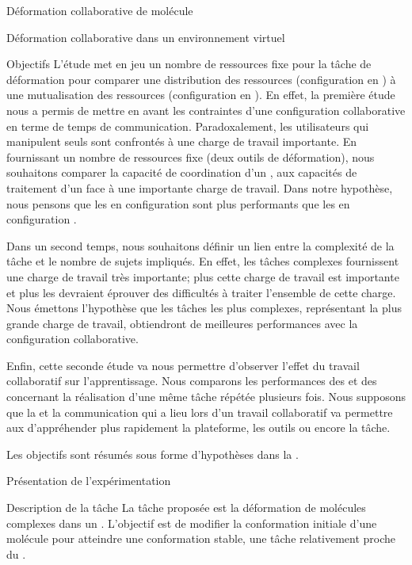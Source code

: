 \documentclass[myfrancais,ngerman,english,french]{mythesis}
\begin{document}
\begin{mychapter}{Déformation collaborative de molécule}
\begin{mysection}{Déformation collaborative dans un environnement virtuel}
\begin{mysubsection}{Objectifs}
				L'étude met en jeu un nombre de ressources fixe pour la tâche de déformation pour comparer une distribution des ressources (configuration  en ) à une mutualisation des ressources (configuration  en ).
				En effet, la première étude nous a permis de mettre en avant les contraintes d'une configuration collaborative en terme de temps de communication.
				Paradoxalement, les utilisateurs qui manipulent seuls sont confrontés à une charge de travail importante.
				En fournissant un nombre de ressources fixe (deux outils de déformation), nous souhaitons comparer la capacité de coordination d'un , aux capacités de traitement d'un  face à une importante charge de travail.
				Dans notre hypothèse, nous pensons que les  en configuration  sont plus performants que les  en configuration .

				Dans un second temps, nous souhaitons définir un lien entre la complexité de la tâche et le nombre de sujets impliqués.
				En effet, les tâches complexes fournissent une charge de travail très importante; plus cette charge de travail est importante et plus les  devraient éprouver des difficultés à traiter l'ensemble de cette charge.
				Nous émettons l'hypothèse que les tâches les plus complexes, représentant la plus grande charge de travail, obtiendront de meilleures performances avec la configuration collaborative.

				Enfin, cette seconde étude va nous permettre d'observer l'effet du travail collaboratif sur l'apprentissage.
				Nous comparons les performances des  et des  concernant la réalisation d'une même tâche répétée plusieurs fois.
				Nous supposons que la   et la communication qui a lieu lors d'un travail collaboratif va permettre aux  d'appréhender plus rapidement la plateforme, les outils ou encore la tâche.

				Les objectifs sont résumés sous forme d'hypothèses dans la .
			\end{mysubsection}
		\end{mysection}
		\begin{mysection}{Présentation de l'expérimentation}
			\begin{mysubsection}{Description de la tâche}
				La tâche proposée est la déformation de molécules complexes dans un .
				L'objectif est de modifier la conformation initiale d'une molécule pour atteindre une conformation stable, une tâche relativement proche du .


\end{mysubsection}
\end{mysection}
\end{mychapter}
\end{document}
